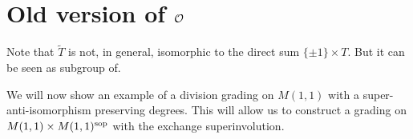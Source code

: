 



%
%
%
% 

\section{Old version of $\mathcal O$}

Note that $\widetilde T$ is not, in general, isomorphic to the direct sum $\{ \pm 1 \} \times T$.
But it can be seen as subgroup of.

We will now show an example of a division grading on $M(1,1)$ with a super-anti-isomorphism preserving degrees.
This will allow us to construct a grading on $M(1,1) \times M(1,1)^{\mathrm{sop}}$ with the exchange superinvolution.

